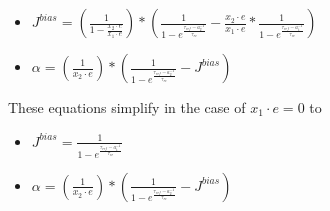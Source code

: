 \documentclass{article}
\begin{document}
\begin{itemize}
\item
  $J^{bias} = (\frac{1}{1-\frac{x_2 \cdot e}{x_1 \cdot e}}) * (\frac{1}{1-e^{\frac{\tau_{ref} - a_2^{-1}}{\tau_{rc}}}} - \frac{x_2 \cdot e}{x_1 \cdot e} * \frac{1}{1-e^{\frac{\tau_{ref} - a_1^{-1}}{\tau_{rc}}}})$
\item
  $\alpha=(\frac{1}{x_2 \cdot e})*(\frac{1}{1-e^{\frac{\tau_{ref} - a_2^{-1}}{\tau_{rc}}}} - J^{bias})$
\end{itemize}

These equations simplify in the case of $x_1 \cdot e=0$ to

\begin{itemize}
\item
  $J^{bias} = \frac{1}{1-e^{\frac{\tau_{ref} - a_1^{-1}}{\tau_{rc}}}}$
\item
  $\alpha = (\frac{1}{x_2 \cdot e}) * (\frac{1}{1-e^{\frac{\tau_{ref} - a_2^{-1}}{\tau_{rc}}}} - J^{bias})$
\end{itemize}
\end{document}

